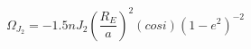 \begin{equation*}
\Omega_{J}_{2} = -1.5nJ_{2}(\frac{R_{E}}{a})^{2}(cosi)(1 - e^{2})^{-2} \tag{4.50}
\end{equation*}
